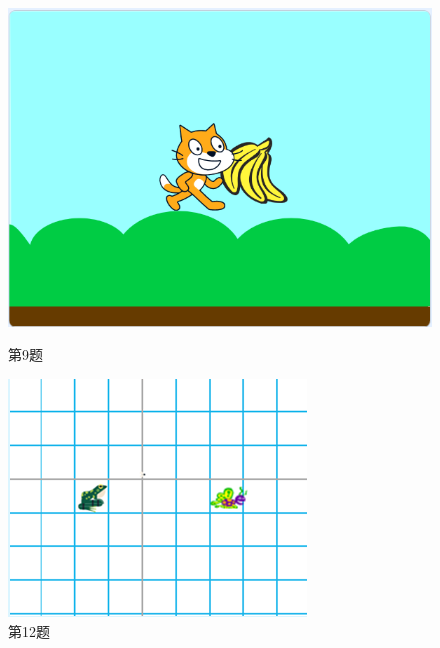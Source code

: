 \documentclass[10.5pt, a4paper]{article}
\begin{document}
\begin{enumerate}
\begin{figure}[htbp]
\begin{minipage}[t]{.4\textwidth}
\begin{minipage}[t]{.4\textwidth}
                \end{minipage}
                \begin{minipage}[t]{.4\textwidth}
                    \centering
                    \includegraphics[width=1\textwidth]{9-3.png}
                \end{minipage}
                \caption*{第9题}
            \end{minipage}
            \begin{minipage}[t]{.23\textwidth}
                \centering
                \includegraphics[width=\textwidth]{12.png}
                \caption*{第12题}
            \end{minipage}

\end{figure}
\end{enumerate}
\end{document}
